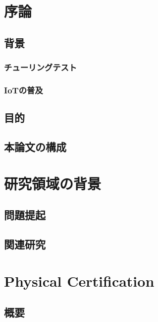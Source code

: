 \section{序論}\label{ux5e8fux8ad6}

\subsection{背景}\label{ux80ccux666f}

\subsubsection{チューリングテスト}\label{ux30c1ux30e5ux30fcux30eaux30f3ux30b0ux30c6ux30b9ux30c8}

\subsubsection{IoTの普及}\label{iotux306eux666eux53ca}

\subsection{目的}\label{ux76eeux7684}

\subsection{本論文の構成}\label{ux672cux8ad6ux6587ux306eux69cbux6210}

\section{研究領域の背景}\label{ux7814ux7a76ux9818ux57dfux306eux80ccux666f}

\subsection{問題提起}\label{ux554fux984cux63d0ux8d77}

\subsection{関連研究}\label{ux95a2ux9023ux7814ux7a76}

\section{Physical Certification}\label{physical-certification}

\subsection{概要}\label{ux6982ux8981}

